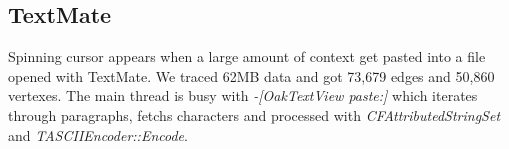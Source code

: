 \subsection{TextMate}

Spinning cursor appears when a large amount of context get pasted into a file
opened with TextMate.  We traced 62MB data and got 73,679 edges and 50,860
vertexes.  The main thread is busy with \textit{-[OakTextView paste:]} which
iterates through paragraphs, fetchs characters and processed with
\textit{CFAttributedStringSet} and \textit{TASCIIEncoder::Encode}.
